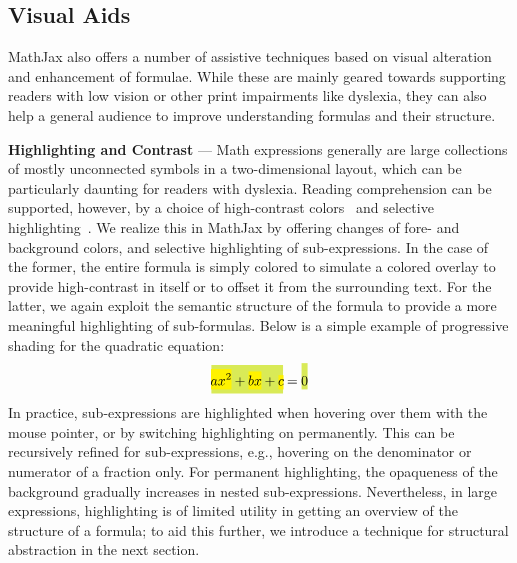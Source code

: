 \documentclass{sig-alternate}
\begin{document}
\def\myparagraph#1{\vspace{1ex}\noindent\textbf{#1} ---}

\subsection{Visual Aids}

MathJax also offers a number of assistive techniques based on visual alteration
and enhancement of formulae. While these are mainly geared towards supporting
readers with low vision or other print impairments like dyslexia, they can also
help a general audience to improve understanding formulas and their structure.

\myparagraph{Highlighting and Contrast} Math expressions generally are large
collections of mostly unconnected symbols in a two-dimensional layout, which can
be particularly daunting for readers with dyslexia.  Reading comprehension can
be supported, however, by a choice of high-contrast
colors~\cite{rello2012optimal} and selective
highlighting~\cite{jones2008strategies}. We realize this in MathJax by offering
changes of fore- and background colors, and selective highlighting of
sub-expressions. In the case of the former, the entire
formula is simply colored to simulate a colored overlay to provide high-contrast
in itself or to offset it from the surrounding text.  For the latter, we again
exploit the semantic structure of the formula to provide a more meaningful
highlighting of sub-formulas. Below is a simple example of progressive shading
for the quadratic equation:
\def\cb#1{\colorbox{yellow}{\ensuremath{\!\!\displaystyle#1\!\!}}}
\def\cc#1{\colorbox{GreenYellow}{\ensuremath{\!\!\displaystyle#1\!\!}}}
\[\cc{\cb{ax^2} + \cb{bx} + \cb{c}} = \cc{\rule[3ex]{0pt}{0pt}0}\]
In practice, sub-expressions are highlighted when hovering over them with the
mouse pointer, or by switching highlighting on permanently. This can be
recursively refined for sub-expressions, e.g., hovering on the denominator or
numerator of a fraction only. For permanent highlighting, the opaqueness of the
background gradually increases in nested sub-expressions. Nevertheless, in large
expressions, highlighting is of limited utility in getting an overview of the structure
of a formula; to aid this further, we introduce a technique for
structural abstraction in the next section.
\end{document}
